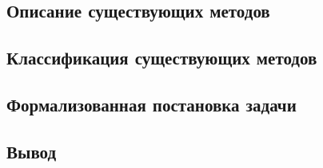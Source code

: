 \subsection{Описание существующих методов}


\subsection{Классификация существующих методов}


\subsection{Формализованная постановка задачи}


\subsection*{Вывод}

